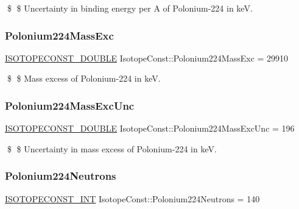 \$ \$ Uncertainty in binding energy per A of Polonium-\/224 in keV. \mbox{\label{group___isotope_const-_polonium-_po224_gab2065455467da59bed63af88f6df5592}} 
\subsubsection{\texorpdfstring{Polonium224\+Mass\+Exc}{Polonium224MassExc}}
{\footnotesize\ttfamily \mbox{\hyperlink{group___isotope_const-_macros_ga8f45a7272ce02c0b4c65c44636ed719a}{I\+S\+O\+T\+O\+P\+E\+C\+O\+N\+S\+T\+\_\+\+D\+O\+U\+B\+LE}} Isotope\+Const\+::\+Polonium224\+Mass\+Exc = 29910}

\$ \$ Mass excess of Polonium-\/224 in keV. \mbox{\label{group___isotope_const-_polonium-_po224_ga94818721fa6996911eeb0b9c5d8f86b0}} 
\subsubsection{\texorpdfstring{Polonium224\+Mass\+Exc\+Unc}{Polonium224MassExcUnc}}
{\footnotesize\ttfamily \mbox{\hyperlink{group___isotope_const-_macros_ga8f45a7272ce02c0b4c65c44636ed719a}{I\+S\+O\+T\+O\+P\+E\+C\+O\+N\+S\+T\+\_\+\+D\+O\+U\+B\+LE}} Isotope\+Const\+::\+Polonium224\+Mass\+Exc\+Unc = 196}

\$ \$ Uncertainty in mass excess of Polonium-\/224 in keV. \mbox{\label{group___isotope_const-_polonium-_po224_ga7e5e070a26019727229faaa3cb8d9c7e}} 
\subsubsection{\texorpdfstring{Polonium224\+Neutrons}{Polonium224Neutrons}}
{\footnotesize\ttfamily \mbox{\hyperlink{group___isotope_const-_macros_ga5f18360b3e99483a35c32d789e62621c}{I\+S\+O\+T\+O\+P\+E\+C\+O\+N\+S\+T\+\_\+\+I\+NT}} Isotope\+Const\+::\+Polonium224\+Neutrons = 140}

